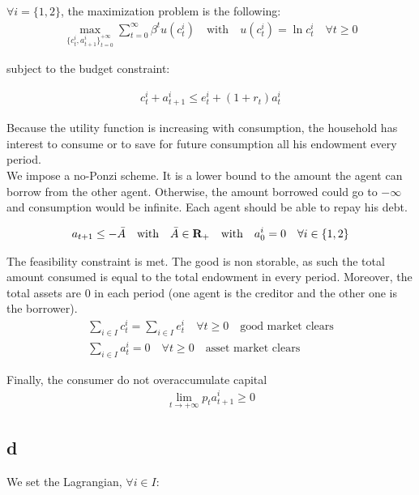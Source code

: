 \documentclass{article}
\begin{document}
$\forall i=\{1,2\}$, the maximization problem is the following:\\

\begin{gather*}
    \max_{\{c_t^i, a_{t+1}^i\}^{+\infty}_{t=0}}\sum_{t=0}^{\infty}\beta^tu(c_t^i)\quad\mbox{with}\quad u(c_t^i)=\ln c_t^i\quad\forall t \geq 0
\end{gather*}

subject to the budget constraint:

\begin{gather*}
    c_t^i+a^i_{t+1}\leq e_t^i+(1+r_t)a_t^i
\end{gather*}

Because the utility function is increasing with consumption, the household has interest to consume or to save for future consumption all his endowment every period.\\

We impose a no-Ponzi scheme. It is a lower bound to the amount the agent can borrow from the other agent. Otherwise, the amount borrowed could go to $-\infty$ and consumption would be infinite. Each agent should be able to repay his debt.

\begin{gather*}
    a_{t+1}\leq-\Bar{A}\quad\mbox{with}\quad \bar{A}\in\mathbf{R}_+\quad\mbox{with}\quad a_0^i=0\quad\forall i\in\{1,2\}
\end{gather*}

The feasibility constraint is met. The good is non storable, as such the total amount consumed is equal to the total endowment in every period. Moreover, the total assets are 0 in each period (one agent is the creditor and the other one is the borrower).\\

\begin{gather*}
    \sum_{i\in I}c_t^i=\sum_{i\in I}e_t^i\quad\forall t\geq0\quad\mbox{good market clears}\\
    \sum_{i\in I}a_t^i=0\quad\forall t\geq0\quad\mbox{asset market clears}
\end{gather*}

Finally, the consumer do not overaccumulate capital
\begin{gather*}
    \lim_{t\rightarrow +\infty} p_ta_{t+1}^i \geq 0
\end{gather*}

\subsection{d}
We set the Lagrangian, $\forall i\in I$:
\end{document}
